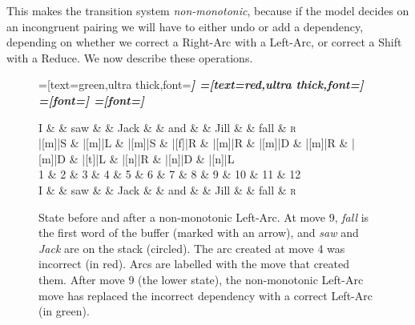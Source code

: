 \documentclass[11pt,letterpaper]{article}
\begin{document}
This makes the transition system \emph{non-monotonic}, because if the model decides
on an incongruent pairing
we will have to either undo or add a
dependency, depending on whether we correct a Right-Arc with a Left-Arc, or correct
a Shift with a Reduce. We now describe these operations.


\begin{figure}
    \centering
    \begin{dependency}[theme=simple]
        =[text=green,ultra thick,font=\bfseries\itshape]
        =[text=red,ultra thick,font=\bfseries\itshape]
        =[font=\bfseries\itshape]
        =[font=\itshape]

        \begin{deptext}[column sep=.075cm, row sep=.1ex]
            I \&           \& saw \&          \& Jack       \& \& and     \&           \& Jill   \&  \& fall \& \textsc{r} \\
|[m]|S \& |[m]|L \& |[m]|S   \& |[f]|R \& |[m]|R \& |[m]|D \& |[m]|R \& |[m]|D \& |[t]|L \& |[n]|R \& |[n]|D \& |[n]|L \\
            1 \&     2       \& 3  \&   4      \& 5          \& 6 \& 7     \& 8 \& 9 \& 10 \& 11 \& 12 \\
    I \&           \& saw \&          \& Jack       \& \& and     \&           \& Jill   \&      \& fall \& \textsc{r} \\
        \end{deptext}
    
    
\end{dependency}
\caption{
    \small
    State before and after a non-monotonic Left-Arc.
    At move 9, \emph{fall} is the first word of the buffer (marked with an arrow),
    and \emph{saw} and \emph{Jack} are on the stack (circled). The arc created at move 4 was
    incorrect (in red). Arcs are labelled with the move that created them.
    After move 9 (the lower state), the non-monotonic Left-Arc move
    has replaced the incorrect dependency with a correct Left-Arc (in green).
\label{fig:clobber}}
\end{figure}
\end{document}
